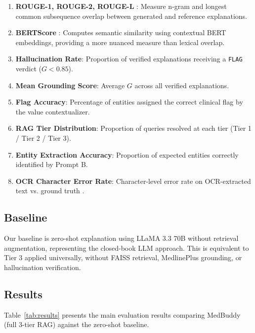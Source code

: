 \documentclass[conference]{IEEEtran}
\begin{document}
\begin{enumerate}
    \item \textbf{ROUGE-1, ROUGE-2, ROUGE-L} \cite{lin2004rouge}: Measure n-gram and longest common subsequence overlap between generated and reference explanations.
    \item \textbf{BERTScore} \cite{zhang2020bertscore}: Computes semantic similarity using contextual BERT embeddings, providing a more nuanced measure than lexical overlap.
    \item \textbf{Hallucination Rate}: Proportion of verified explanations receiving a \texttt{FLAG} verdict ($G < 0.85$).
    \item \textbf{Mean Grounding Score}: Average $G$ across all verified explanations.
    \item \textbf{Flag Accuracy}: Percentage of entities assigned the correct clinical flag by the value contextualizer.
    \item \textbf{RAG Tier Distribution}: Proportion of queries resolved at each tier (Tier 1 / Tier 2 / Tier 3).
    \item \textbf{Entity Extraction Accuracy}: Proportion of expected entities correctly identified by Prompt B.
    \item \textbf{OCR Character Error Rate}: Character-level error rate on OCR-extracted text vs. ground truth \cite{rice1996measuring}.
\end{enumerate}

\subsection{Baseline}

Our baseline is zero-shot explanation using LLaMA 3.3 70B without retrieval augmentation, representing the closed-book LLM approach. This is equivalent to Tier 3 applied universally, without FAISS retrieval, MedlinePlus grounding, or hallucination verification.

\subsection{Results}

Table~\ref{tab:results} presents the main evaluation results comparing MedBuddy (full 3-tier RAG) against the zero-shot baseline.
\end{document}
